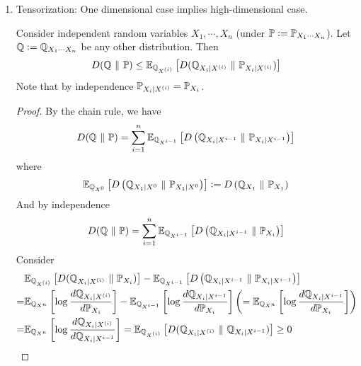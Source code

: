 \begin{enumerate}[label=\arabic{*}.]
	\item Tensorization: One dimensional case implies high-dimensional case.
	\begin{lem}
	    Consider independent random variables $X_1,\cdots,X_n$ (under $\mathbb{P} \vcentcolon= \mathbb{P}_{X_1\cdots X_n}$). Let $\mathbb{Q} \vcentcolon=\mathbb{Q}_{X_1\cdots X_n}$ be any other distribution. Then
	    \begin{equation*}
	        D(\mathbb{Q}~\Vert~\mathbb{P}) \leq \mathbb{E}_{\mathbb{Q}_{X^{(i)}}}\left[D(\mathbb{Q}_{X_i \mid X^{(i)}}~\Vert~\mathbb{P}_{X_i \mid X^{(i)}})\right]
	    \end{equation*}
	    Note that by independence $\mathbb{P}_{X_i \mid X^{(i)}} = \mathbb{P}_{X_i}$.
	\end{lem}
	\begin{proof}
	    By the chain rule, we have
	    \begin{equation*}
	        D(\mathbb{Q}~\Vert~\mathbb{P}) = \sum_{i=1}^n \mathbb{E}_{\mathbb{Q}_{X^{i-1}}}\left[D\left(\mathbb{Q}_{X_i \mid X^{i-1}} ~\Vert~ \mathbb{P}_{X_i \mid X^{i-1}}\right)\right]
	    \end{equation*}
	    where
	    \begin{equation*}
	        \mathbb{E}_{\mathbb{Q}_{X^{0}}}\left[D\left(\mathbb{Q}_{X_1 \mid X^{0}} ~\Vert~ \mathbb{P}_{X_1 \mid X^{0}}\right)\right] \vcentcolon= D\left(\mathbb{Q}_{X_1} ~\Vert~ \mathbb{P}_{X_1}\right)
	    \end{equation*}
	    And by independence
	    \begin{equation*}
	        D(\mathbb{Q}~\Vert~\mathbb{P}) = \sum_{i=1}^n \mathbb{E}_{\mathbb{Q}_{X^{i-1}}}\left[D\left(\mathbb{Q}_{X_i \mid X^{i-1}} ~\Vert~ \mathbb{P}_{X_i}\right)\right]
	    \end{equation*}
	    Consider
	    \begin{equation*}
	        \begin{aligned}
	        	&\E_{\mathbb{Q}_{X^{(i)}}}\bj{D(\mathbb{Q}_{X_i \mid X^{(i)}}~\Vert~\mathbb{P}_{X_i})} - \E_{\mathbb{Q}_{X^{i-1}}}\bj{D\bc{\mathbb{Q}_{X_i \mid X^{i-1}} ~\Vert~ \mathbb{P}_{X_i \mid X^{i-1}}}}\\
	        	=& \E_{\mathbb{Q}_{X^n}}\bj{\log \frac{d\mathbb{Q}_{X_i \mid X^{(i)}}}{d\mathbb{P}_{X_i}}} -\E_{\mathbb{Q}_{X^{i-1}}}\bj{\log \frac{d\mathbb{Q}_{X_i \mid X^{i-1}}}{d\mathbb{P}_{X_i}}} \bc{= \E_{\mathbb{Q}_{X^{n}}}\bj{\log \frac{d\mathbb{Q}_{X_i \mid X^{i-1}}}{d\mathbb{P}_{X_i}}}}\\
	        	=& \E_{\mathbb{Q}_{X^n}} \bj{\log \frac{d\mathbb{Q}_{X_i \mid X^{(i)}}}{d\mathbb{Q}_{X_i \mid X^{i-1}}}} = \E_{\mathbb{Q}_{X^{(i)}}}\bj{D(\mathbb{Q}_{X_i \mid X^{(i)}} ~\Vert~\mathbb{Q}_{X_i \mid X^{i-1}})} \geq 0 \qedhere

\end{aligned}
\end{equation*}
\end{proof}
\end{enumerate}
